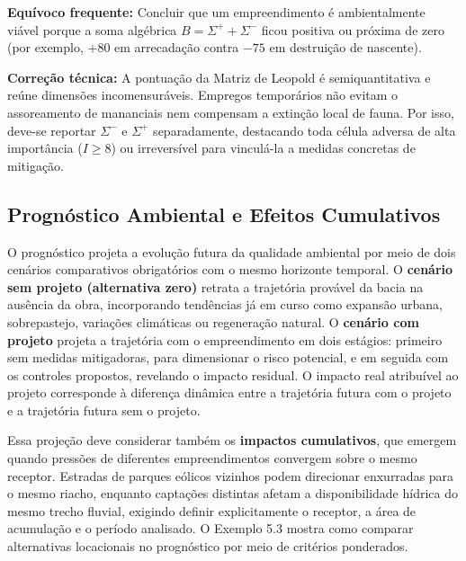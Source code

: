 \begin{boxErro}
  \textbf{Equívoco frequente:} Concluir que um empreendimento é ambientalmente viável porque a soma algébrica $B = \Sigma^{+} + \Sigma^{-}$ ficou positiva ou próxima de zero (por exemplo, $+80$ em arrecadação contra $-75$ em destruição de nascente).\par
  \textbf{Correção técnica:} A pontuação da Matriz de Leopold é semiquantitativa e reúne dimensões incomensuráveis. Empregos temporários não evitam o assoreamento de mananciais nem compensam a extinção local de fauna. Por isso, deve-se reportar $\Sigma^{-}$ e $\Sigma^{+}$ separadamente, destacando toda célula adversa de alta importância ($I \ge 8$) ou irreversível para vinculá-la a medidas concretas de mitigação.
\end{boxErro}

\subsection{Prognóstico Ambiental e Efeitos Cumulativos}

O prognóstico projeta a evolução futura da qualidade ambiental por meio de dois cenários comparativos obrigatórios com o mesmo horizonte temporal. O \textbf{cenário sem projeto (alternativa zero)} retrata a trajetória provável da bacia na ausência da obra, incorporando tendências já em curso como expansão urbana, sobrepastejo, variações climáticas ou regeneração natural. O \textbf{cenário com projeto} projeta a trajetória com o empreendimento em dois estágios: primeiro sem medidas mitigadoras, para dimensionar o risco potencial, e em seguida com os controles propostos, revelando o impacto residual. O impacto real atribuível ao projeto corresponde à diferença dinâmica entre a trajetória futura com o projeto e a trajetória futura sem o projeto.

Essa projeção deve considerar também os \textbf{impactos cumulativos}, que emergem quando pressões de diferentes empreendimentos convergem sobre o mesmo receptor. Estradas de parques eólicos vizinhos podem direcionar enxurradas para o mesmo riacho, enquanto captações distintas afetam a disponibilidade hídrica do mesmo trecho fluvial, exigindo definir explicitamente o receptor, a área de acumulação e o período analisado. O Exemplo 5.3 mostra como comparar alternativas locacionais no prognóstico por meio de critérios ponderados.

